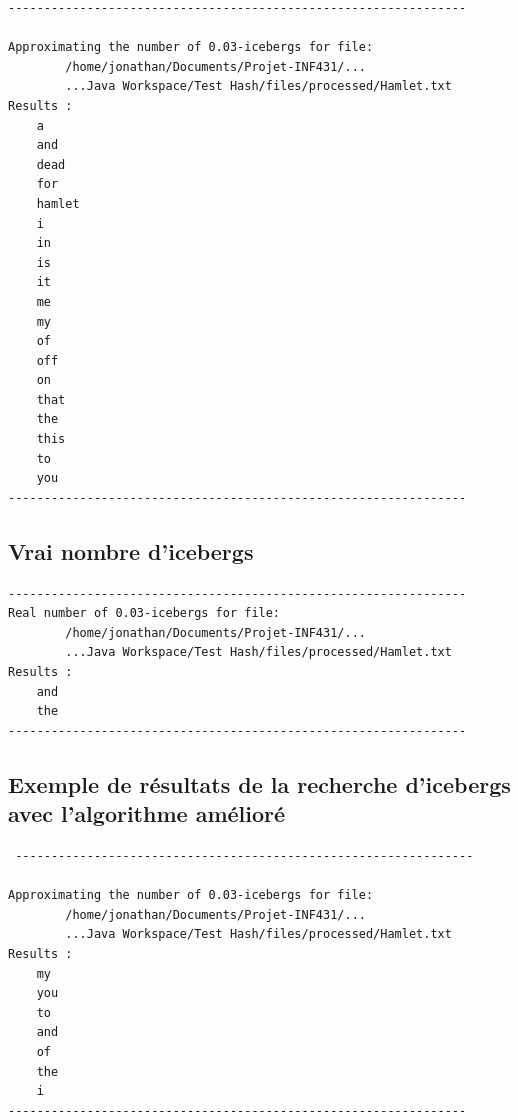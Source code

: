 \documentclass[12pt,a4paper,titlepage]{article}
\begin{document}
\begin{verbatim}
----------------------------------------------------------------

Approximating the number of 0.03-icebergs for file:
        /home/jonathan/Documents/Projet-INF431/...
        ...Java Workspace/Test Hash/files/processed/Hamlet.txt
Results :
    a
    and
    dead
    for
    hamlet
    i
    in
    is
    it
    me
    my
    of
    off
    on
    that
    the
    this
    to
    you
----------------------------------------------------------------
\end{verbatim}

\subsection*{Vrai nombre d'icebergs}
\label{exemple:icebergsBenchmark}

\begin{verbatim}
----------------------------------------------------------------
Real number of 0.03-icebergs for file:
        /home/jonathan/Documents/Projet-INF431/...
        ...Java Workspace/Test Hash/files/processed/Hamlet.txt	
Results :
    and
    the
----------------------------------------------------------------
\end{verbatim}

\newpage
\subsection*{Exemple de résultats de la recherche d'icebergs avec l'algorithme amélioré}
\label{exemple:icebergsImproved}
 
 \begin{verbatim}
 ----------------------------------------------------------------

Approximating the number of 0.03-icebergs for file:
        /home/jonathan/Documents/Projet-INF431/...
        ...Java Workspace/Test Hash/files/processed/Hamlet.txt
Results :
    my
    you
    to
    and
    of
    the
    i
----------------------------------------------------------------
 \end{verbatim}
 
 
\end{document}
